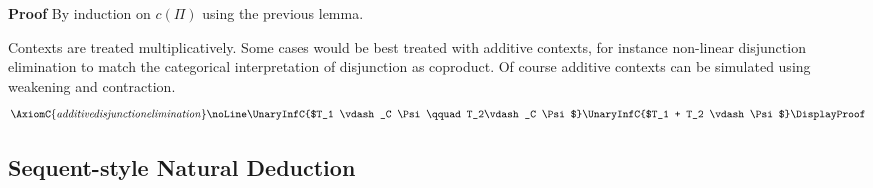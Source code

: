 \noindent
{\bf Proof} By induction on $c(\Pi)$ using the previous lemma. 

\begin{remark}\label{additive}
Contexts are treated multiplicatively. Some cases would be best treated with additive contexts, for instance non-linear disjunction elimination to match  the categorical interpretation of disjunction as coproduct. 
Of course additive contexts can be simulated using weakening and contraction.  
 \[
\AxiomC{\it additive disjunction elimination}
\noLine
\UnaryInfC{$T_1 \vdash_C \Psi\qquad T_2\vdash_C \Psi$}
\UnaryInfC{$T_1 + T_2 \vdash \Psi$}
\DisplayProof
\]
\end{remark}

\subsection{Sequent-style Natural Deduction}
\label{sec:sequent-style_natural_deduction}

